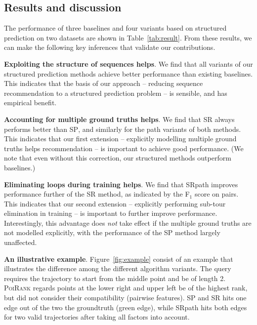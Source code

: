 \secmoveup
\subsection{Results and discussion}
\label{sec:result}
\textmoveup



The performance of three baselines and four variants based on structured prediction on two datasets are shown in Table~\ref{tab:result}.
From these results, we can make the following key inferences that validate our contributions.

\textbf{Exploiting the structure of sequences helps}.
We find that all variants of our structured prediction methods achieve better performance than existing baselines.
This indicates that the basis of our approach -- reducing sequence recommendation to a structured prediction problem -- is sensible, and has empirical benefit.

\textbf{Accounting for multiple ground truths helps}.
We find that \textsc{SR} always performs better than \textsc{SP},
and similarly for the {\sc path} variants of both methods.
This indicates that our first extension -- explicitly modelling multiple ground truths helps recommendation -- is important to achieve good performance.
(We note that even without this correction, our structured methods outperform baselines.)

\textbf{Eliminating loops during training helps}.
We find that {\sc SRpath} improves performance further of the {\sc SR} method,
as indicated by the F$_1$ score on pairs.
This indicates that our second extension -- explicitly performing sub-tour elimination in training -- is important to further improve performance.
Interestingly,
this advantage does \emph{not} take effect if the multiple ground truths are not modelled explicitly,
with the performance of the {\sc SP} method largely unaffected.

\textbf{An illustrative example}. Figure~\ref{fig:example} consist of an example that illustrates the difference among the different algorithm variants. The query requires the trajectory to start from the middle point and be of length 2.
\textsc{PoiRank} regards points at the lower right and upper left be of the highest rank, but did not consider their compatibility (\ie pairwise features). {\sc SP} and {\sc SR} hits one edge out of the two the groundtruth (green edge), while {\sc SRpath} hits both edges for two valid trajectories after taking all factors into account.

